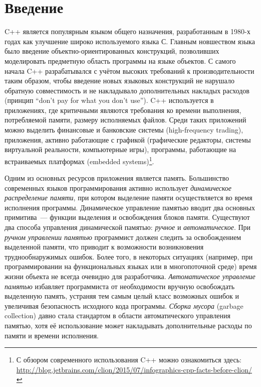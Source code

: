 \section*{Введение}

C++ является популярным языком общего назначения, разработанным в 1980-х 
годах как улучшение широко используемого языка С. 
Главным новшеством языка было введение объектно-ориентированных конструкций, 
позволивших моделировать предметную область программы на языке объектов. 
С самого начала C++ разрабатывался с учётом высоких требований к производительности 
таким образом, чтобы введение новых языковых конструкций не нарушало обратную совместимость 
и не накладывало дополнительных накладых расходов (принцип ``don't pay for what you don't use''). 
C++ используется в приложениях, где критичными являются требования ко времени выполнения, 
потребляемой памяти, размеру исполняемых файлов. 
Среди таких приложений можно выделить финансовые и банковские системы (high-frequency trading), 
приложения, активно работающие с графикой (графические редакторы, системы виртуальной реальности, 
компьютерные игры), программы, работающие на встраиваемых платформах (embedded systems)\footnote{С обзором современного использования C++ можно ознакомиться здесь: 
\url{http://blog.jetbrains.com/clion/2015/07/infographics-cpp-facts-before-clion/}}.

Одним из основных ресурсов приложения является память. 
Большинство современных языков программирования активно использует \emph{динамическое 
распределение памяти}, при котором выделение памяти осуществляется во время исполнения программы. 
Динамическое управление памятью вводит два основных примитива~--- функции 
выделения и освобождения блоков памяти. 
Существуют два способа управления динамической памятью: \emph{ручное} и \emph{автоматическое}. 
При \emph{ручном управлении памятью} программист должен следить за освобождением выделенной 
памяти, что приводит к возможности возникновения труднообнаружимых ошибок. 
Более того, в некоторых ситуациях (например, при программировании на функциональных языках или 
в многопоточной среде) время жизни объекта не всегда очевидно для разработчика. 
\emph{Автоматическое управление памятью} избавляет программиста от необходимости вручную 
освобождать выделенную память, устраняя тем самым целый класс возможных ошибок и увеличивая 
безопасность исходного кода программы. 
\emph{Сборка мусора} (garbage collection) давно стала стандартом в области автоматического 
управления памятью, хотя её использование может накладывать дополнительные расходы по памяти 
и времени исполнения.


